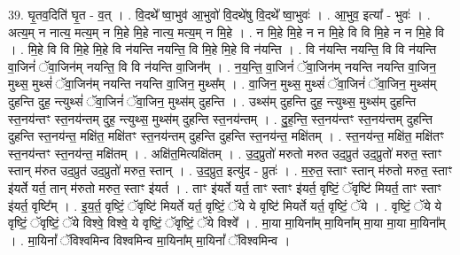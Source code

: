 \documentclass[17pt]{extarticle}
\begin{document}
39. घृ॒तव॒दिति॑ घृ॒त - व॒त् । . वि॒दथे᳚ ष्वा॒भुव॑ आ॒भुवो॑ वि॒दथे॑षु वि॒दथे᳚ ष्वा॒भुवः॑ । . आ॒भुव॒ इत्या᳚ - भुवः॑ । . अत्य॒म् न नात्य॒ मत्य॒म् न मि॒हे मि॒हे नात्य॒ मत्य॒म् न मि॒हे । . न मि॒हे मि॒हे न न मि॒हे वि वि मि॒हे न न मि॒हे वि । . मि॒हे वि वि मि॒हे मि॒हे वि न॑यन्ति नयन्ति॒ वि मि॒हे मि॒हे वि न॑यन्ति । . वि न॑यन्ति नयन्ति॒ वि वि न॑यन्ति वा॒जिनं॑ ॅवा॒जिन॑म् नयन्ति॒ वि वि न॑यन्ति वा॒जिन᳚म् । . न॒य॒न्ति॒ वा॒जिनं॑ ॅवा॒जिन॑म् नयन्ति नयन्ति वा॒जिन॒ मुथ्स॒ मुथ्सं॑ ॅवा॒जिन॑म् नयन्ति नयन्ति वा॒जिन॒ मुथ्स᳚म् । . वा॒जिन॒ मुथ्स॒ मुथ्सं॑ ॅवा॒जिनं॑ ॅवा॒जिन॒ मुथ्स॑म् दुहन्ति दुह॒ न्त्युथ्सं॑ ॅवा॒जिनं॑ ॅवा॒जिन॒ मुथ्स॑म् दुहन्ति । . उथ्स॑म् दुहन्ति दुह॒ न्त्युथ्स॒ मुथ्स॑म् दुहन्ति स्त॒नय॑न्तꣳ स्त॒नय॑न्तम् दुह॒ न्त्युथ्स॒ मुथ्स॑म् दुहन्ति स्त॒नय॑न्तम् । . दु॒ह॒न्ति॒ स्त॒नय॑न्तꣳ स्त॒नय॑न्तम् दुहन्ति दुहन्ति स्त॒नय॑न्त॒ मक्षि॑त॒ मक्षि॑तꣳ स्त॒नय॑न्तम् दुहन्ति दुहन्ति स्त॒नय॑न्त॒ मक्षि॑तम् । . स्त॒नय॑न्त॒ मक्षि॑त॒ मक्षि॑तꣳ स्त॒नय॑न्तꣳ स्त॒नय॑न्त॒ मक्षि॑तम् । . अक्षि॑त॒मित्यक्षि॑तम् । . उ॒द॒प्रुतो॑ मरुतो मरुत उद॒प्रुत॑ उद॒प्रुतो॑ मरुत॒ स्ताꣳ स्तान् म॑रुत उद॒प्रुत॑ उद॒प्रुतो॑ मरुत॒ स्तान् । . उ॒द॒प्रुत॒ इत्यु॑द - प्रुतः॑ । . म॒रु॒त॒ स्ताꣳ स्तान् म॑रुतो मरुत॒ स्ताꣳ इ॑यर्ते यर्त॒ तान् म॑रुतो मरुत॒ स्ताꣳ इ॑यर्त । . ताꣳ इ॑यर्ते यर्त॒ ताꣳ स्ताꣳ इ॑यर्त॒ वृष्टिं॒ ॅवृष्टि॑ मियर्त॒ ताꣳ स्ताꣳ इ॑यर्त॒ वृष्टि᳚म् । . इ॒य॒र्त॒ वृष्टिं॒ ॅवृष्टि॑ मियर्ते यर्त॒ वृष्टिं॒ ॅये ये वृष्टि॑ मियर्ते यर्त॒ वृष्टिं॒ ॅये । . वृष्टिं॒ ॅये ये वृष्टिं॒ ॅवृष्टिं॒ ॅये विश्वे॒ विश्वे॒ ये वृष्टिं॒ ॅवृष्टिं॒ ॅये विश्वे᳚ । . मा॒या मा॒यिना᳚म् मा॒यिना᳚म् मा॒या मा॒या मा॒यिना᳚म् । . मा॒यिनां᳚ ॅविश्वमिन्व विश्वमिन्व मा॒यिना᳚म् मा॒यिनां᳚ ॅविश्वमिन्व । \newline
\end{document}
